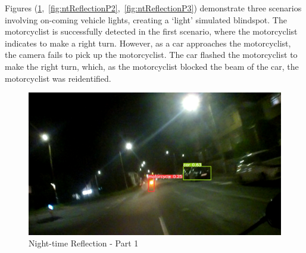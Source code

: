 \documentclass[12pt]{report} %
\begin{document}
		\clearpage
		Figures (\ref{fig:ntReflectionP1},~\ref{fig:ntReflectionP2},~\ref{fig:ntReflectionP3}) demonstrate three scenarios involving on-coming vehicle lights, creating a `light' simulated blindspot. The motorcyclist is successfully detected in the first scenario, where the motorcyclist indicates to make a right turn. However, as a car approaches the motorcyclist, the camera fails to pick up the motorcyclist. The car flashed the motorcyclist to make the right turn, which, as the motorcyclist blocked the beam of the car, the motorcyclist was reidentified.
		\begin{figure}[ht]
			\centering
			\includegraphics[width=.74\columnwidth]{Figures/scenarios/night_t1/Night_T1-505.jpg}
			\caption{Night-time Reflection - Part 1}
			\label{fig:ntReflectionP1}
		\end{figure}
\end{document}
